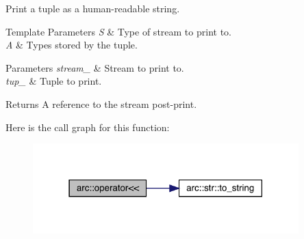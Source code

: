 Print a tuple as a human-\/readable string.


\begin{DoxyTemplParams}{Template Parameters}
{\em S} & Type of stream to print to. \\
\hline
{\em A} & Types stored by the tuple.\\
\hline
\end{DoxyTemplParams}

\begin{DoxyParams}{Parameters}
{\em stream\+\_\+} & Stream to print to. \\
\hline
{\em tup\+\_\+} & Tuple to print.\\
\hline
\end{DoxyParams}
\begin{DoxyReturn}{Returns}
A reference to the stream post-\/print. 
\end{DoxyReturn}
Here is the call graph for this function\+:\nopagebreak
\begin{figure}[H]
\begin{center}
\leavevmode
\includegraphics[width=291pt]{namespacearc_a50e1f816ae8c0b1a32e9adabbe66579a_cgraph}
\end{center}
\end{figure}
